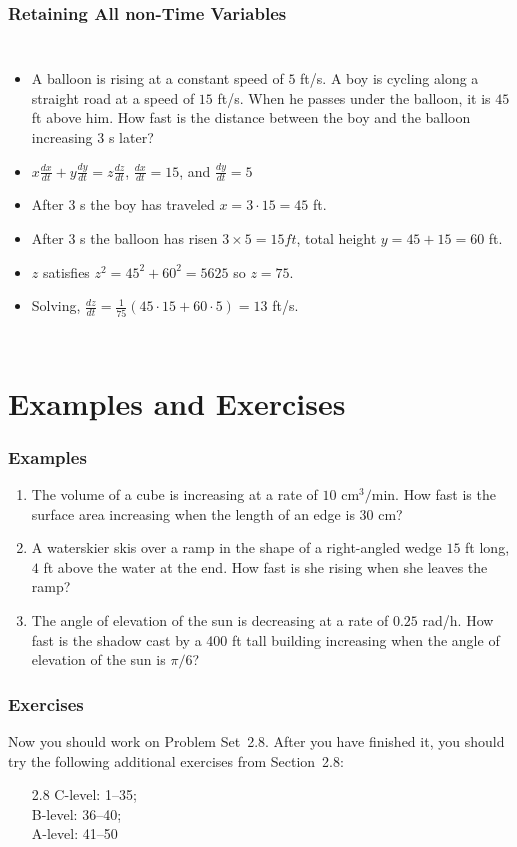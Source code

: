 \documentclass[serif,ignorenonframetext]{beamer}
\newcommand{\ds}{\displaystyle}
\begin{document}
\begin{frame}
  \frametitle{Retaining All non-Time Variables}
  \begin{columns}
  \begin{itemize}[<+->]
  \item A balloon is rising at a constant speed of $5$ ft/s.  A boy is
    cycling along a straight road at a speed of $15$ ft/s.  When he
    passes under the balloon, it is $45$ ft above him.  How fast is
    the distance between the boy and the balloon increasing $3$ s later?
  \item $\ds x \frac{dx}{dt} + y \frac{dy}{dt} = z \frac{dz}{dt}$,
    $\ds \frac{dx}{dt} = 15$, and $\ds \frac{dy}{dt} = 5$
  \item After 3 s the boy has traveled $x=3\cdot 15=45$ ft.
  \item After 3 s the balloon has risen $3\times 5=15 ft$,
    total height $y=45+15=60$ ft.
  \item $z$ satisfies $z^2=45^2+60^2=5625$ so $z=75$.
  \item Solving, $\ds \frac{dz}{dt}
    =\frac{1}{75}\left(45\cdot 15+60\cdot 5\right)
    =13$ ft/s. 
  \end{itemize}
  \end{columns}
\end{frame}


\section{Examples and Exercises}

\begin{frame}
  \frametitle{Examples}
  \begin{enumerate}
  \item The volume of a cube is increasing at a rate of $10$ cm$^3/$min.
    How fast is the surface area increasing when the length of an
    edge is $30$ cm?
  \item A waterskier skis over a ramp in the shape of a right-angled
    wedge $15$ ft long, $4$ ft above the water at the end.  How 
    fast is she rising when she leaves the ramp?
  \item The angle of elevation of the sun is decreasing at a rate of
    $0.25$ rad/h.  How fast is the shadow cast by a 400 ft tall
    building increasing when the angle of elevation of the sun is $\pi/6$?
  \end{enumerate}
\end{frame}

\begin{frame}
  \frametitle{Exercises}
  Now you should work on Problem Set~2.8.  After you have finished it,
  you should try the following additional exercises from Section~2.8:
  \begin{itemize}
  \item[2.8] C-level: 1--35; \\
    B-level: 36--40; \\
    A-level: 41--50
  \end{itemize}
\end{frame}
\end{document}
